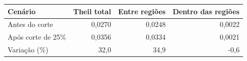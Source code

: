 \begin{tabular}{lrrr}
\toprule
Cenário & Theil total & Entre regiões & Dentro das regiões \\
\midrule
Antes do corte & 0,0270 & 0,0248 & 0,0022 \\
Após corte de 25\% & 0,0356 & 0,0334 & 0,0021 \\
Variação (\%) & 32,0 & 34,9 & -0,6 \\
\bottomrule
\end{tabular}
